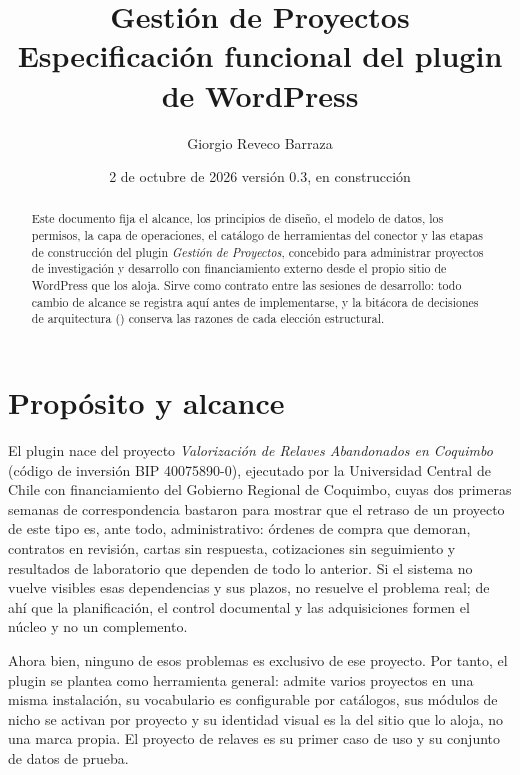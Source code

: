 \documentclass[11pt,a4paper]{article}
\title{\color{marino}\bfseries Gestión de Proyectos\\[4pt]\large\mdseries Especificación funcional del plugin de WordPress}
\author{Giorgio Reveco Barraza}
\date{2 de octubre de 2026 \quad\textcolor{grismedio}{versión 0.3, en construcción}}
\begin{document}
\maketitle
\thispagestyle{fancy}

\begin{abstract}
\noindent Este documento fija el alcance, los principios de diseño, el modelo de datos, los permisos, la capa de operaciones, el catálogo de herramientas del conector y las etapas de construcción del plugin \emph{Gestión de Proyectos}, concebido para administrar proyectos de investigación y desarrollo con financiamiento externo desde el propio sitio de WordPress que los aloja. Sirve como contrato entre las sesiones de desarrollo: todo cambio de alcance se registra aquí antes de implementarse, y la bitácora de decisiones de arquitectura () conserva las razones de cada elección estructural.
\end{abstract}

\tableofcontents
\newpage

\section{Propósito y alcance}

El plugin nace del proyecto \emph{Valorización de Relaves Abandonados en Coquimbo} (código de inversión BIP 40075890-0), ejecutado por la Universidad Central de Chile con financiamiento del Gobierno Regional de Coquimbo, cuyas dos primeras semanas de correspondencia bastaron para mostrar que el retraso de un proyecto de este tipo es, ante todo, administrativo: órdenes de compra que demoran, contratos en revisión, cartas sin respuesta, cotizaciones sin seguimiento y resultados de laboratorio que dependen de todo lo anterior. Si el sistema no vuelve visibles esas dependencias y sus plazos, no resuelve el problema real; de ahí que la planificación, el control documental y las adquisiciones formen el núcleo y no un complemento.

Ahora bien, ninguno de esos problemas es exclusivo de ese proyecto. Por tanto, el plugin se plantea como herramienta general: admite varios proyectos en una misma instalación, su vocabulario es configurable por catálogos, sus módulos de nicho se activan por proyecto y su identidad visual es la del sitio que lo aloja, no una marca propia. El proyecto de relaves es su primer caso de uso y su conjunto de datos de prueba.
\end{document}
